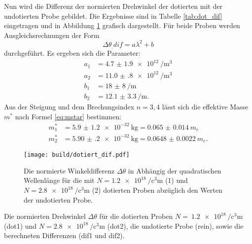 \noindent Nun wird die Differenz der normierten Drehwinkel der dotierten mit der undotierten Probe gebildet. Die Ergebnisse sind in Tabelle \ref{tab:dot_dif} eingetragen und in Abbildung \ref{fig:dot_dif} grafisch dargestellt.
Für beide Proben werden Ausgleichsrechnungen der Form
\[
\Delta\theta_.{dif}=a\lambda^2+b
\] 
durchgeführt.
Es ergeben sich die Parameter:
\begin{align*}
a_1 &= \SI{4.7(19)e12}{\per\cubic\metre}\\
a_2 &= \SI{11.0(8)e12}{\per\cubic\metre}\\
b_1 &= \SI{18(8)}{\per\metre}\\
b_2 &= \SI{12.1(33)}{\per\metre}\text{.}
\end{align*}
Aus der Steigung und dem Brechungsindex $n=3,4$ \cite{litgas} lässt sich die effektive Masse $m^*$ nach Formel \eqref{eq:mstar} bestimmen:
\begin{align*}
m^*_1 &= \SI{5.9(12)e-32}{\kilogram} = \SI{0.065(14)}{m_e}\\
m^*_2 &= \SI{5.90(20)e-32}{\kilogram} = \SI{0.0648(22)}{m_e}\text{.}
\end{align*}

\begin{figure}
	\centering
	\texttt{[image: build/dotiert\_dif.pdf]}
	\caption{Die normierte Winkeldifferenz $\Delta\theta$ in Abhängig der quadratischen Wellenlänge für die mit $N=\SI{1.2e18}{\per\cubic\centi\metre}$ (1) und $N=\SI{2.8e18}{\per\cubic\centi\metre}$ (2) dotierten Proben abzüglich den Werten der undotierten Probe.}
	\label{fig:dot_dif}
\end{figure}

\begin{table}
	\centering
	\caption{Die normierten Drehwinkel $\Delta\theta$ für die dotierten Proben $N=~\SI{1.2e18}{\per\cubic\centi\metre}$ (dot1) und $N=\SI{2.8e18}{\per\cubic\centi\metre}$ (dot2), die undotierte Probe (rein), sowie die berechneten Differenzen (dif1 und dif2).}
	
	\label{tab:dot_dif}
\end{table}